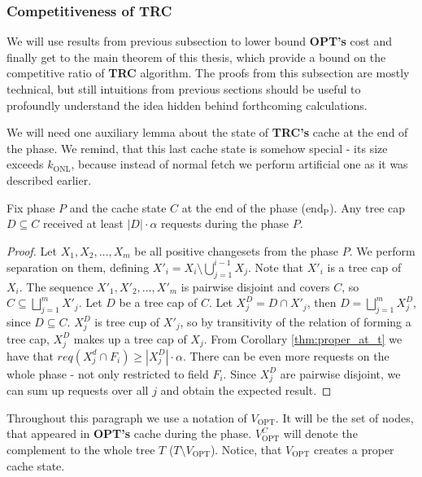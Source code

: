 \subsubsection{Competitiveness of TRC} We will use results from
previous subsection to lower bound \textbf{OPT's} cost and finally get to the main
theorem of this thesis, which provide a bound on the competitive ratio of \textbf{TRC}
algorithm. The proofs from this subsection are mostly technical, but still
intuitions from previous sections should be useful to profoundly understand the idea
hidden behind forthcoming calculations.

We will need one auxiliary lemma about the state of \textbf{TRC's} cache at the
end of the phase. We remind, that this last cache state is somehow special - its size
exceeds $k_{\mathrm{ONL}}$, because instead of normal fetch we perform
artificial one as it was described earlier. 
\begin{lemma} 
Fix phase $P$ and the
cache state  $C$ at the end of the phase ($\mathrm{end_P}$). Any tree cap $D
\subseteq C$ received at least $|D| \cdot \alpha$ requests during the phase $P$.
\label{thm:lots_of_req_in_tc_end_of_p} 
\end{lemma}
\begin{proof}
Let $X_1, X_2,
\ldots, X_m$ be all positive changesets from the phase $P$.  We perform
separation on them, defining $X'_i = X_i \setminus \bigcup_{j=1}^{i-1} X_j$.
Note that $X'_i$ is a tree cap of $X_i$. The sequence $X'_1, X'_2, \ldots, X'_m$
is pairwise disjoint and covers $C$, so $C \subseteq \bigsqcup_{j=1}^m X'_j$.
Let $D$ be a tree cap of $C$.
Let $X_j^D = D \cap X'_j$, then $D = \bigsqcup_{j=1}^m X_j^D$, since $D
\subseteq C$. $X_j^D$ is tree cup of $X'_j$, so by transitivity of the relation
of forming a tree cap, $X_j^D$ makes up a tree cap of $X_j$. From Corollary
\ref{thm:proper_at_t} we have that $req(X_j^d \cap F_i) \geq |X_j^D| \cdot
\alpha$. There can be even more requests on the whole phase - not only
restricted to field $F_i$. Since $X_j^D$ are pairwise disjoint, we can sum up
requests over all $j$ and obtain the expected result.  \end{proof}


Throughout this paragraph we use a notation of $V_{\mathrm{OPT}}$. It will be
the set of nodes, that appeared in \textbf{OPT's} cache during the phase.
$V_{\mathrm{OPT}}^C$ will denote the complement to the whole tree $T$ ($T
\setminus V_{\mathrm{OPT}}$).  Notice, that $V_{\mathrm{OPT}}$ creates a proper
cache state.

